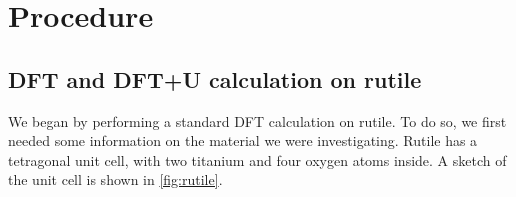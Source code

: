\section{Procedure}
\subsection{DFT and DFT+U calculation on rutile}
We began by performing a standard DFT calculation on rutile. To do so, we first needed some information on the material we were investigating. Rutile has a tetragonal unit cell, with two titanium and four oxygen atoms inside. A sketch of the unit cell is shown in \cref{fig:rutile}.
